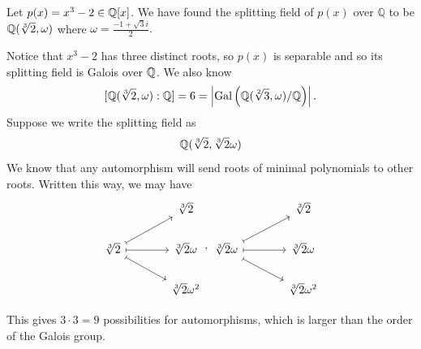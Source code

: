 \begin{example}
    Let $p(x) = x^3-2 \in \mathbb{Q}[x]$. We have found the splitting field of $p(x)$ over $\mathbb{Q}$ to be $\mathbb{Q}(\sqrt[3]{2}, \omega)$ where $\omega = \frac{-1+\sqrt{3}i}{2}.$

    Notice that $x^3-2$ has three distinct roots, so $p(x)$ is separable and so its splitting field is Galois over $\mathbb{Q}$. We also know
    $$[\mathbb{Q}(\sqrt[3]{2}, \omega):\mathbb{Q}] = 6 = \left| \text{Gal}\left(\mathbb{Q}(\sqrt[2]{3}, \omega)/\mathbb{Q}\right)\right|.$$
    Suppose we write the splitting field as
    $$\mathbb{Q}(\sqrt[3]{2}, \sqrt[3]{2}\omega)$$
    We know that any automorphism will send roots of minimal polynomials to other roots. Written this way, we may have 
    \[
        \begin{tikzcd}[column sep=large]
            & \sqrt[3]{2} \\
            \sqrt[3]{2} \arrow[ru, mapsto] \arrow[r, mapsto] \arrow[rd, mapsto] & \sqrt[3]{2} \omega \\
            & \sqrt[3]{2} \omega^2
        \end{tikzcd}, 
        \begin{tikzcd}[column sep=large]
            & \sqrt[3]{2} \\
            \sqrt[3]{2}\omega \arrow[ru, mapsto] \arrow[r, mapsto] \arrow[rd, mapsto] & \sqrt[3]{2} \omega \\
            & \sqrt[3]{2} \omega^2
        \end{tikzcd}
    \]

    This gives $3 \cdot 3 = 9$ possibilities for automorphisms, which is larger than the order of the Galois group. 


\end{example}
